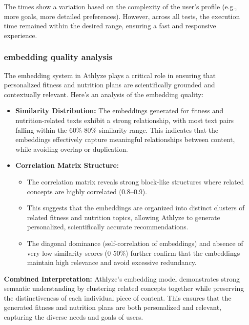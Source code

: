 \documentclass[conference]{IEEEtran}
\begin{document}
The times show a variation based on the complexity of the user's profile (e.g., more goals, more detailed preferences). However, across all tests, the execution time remained within the desired range, ensuring a fast and responsive experience.

\subsubsection{embedding quality analysis}

The embedding system in Athlyze plays a critical role in ensuring that personalized fitness and nutrition plans are scientifically grounded and contextually relevant. Here's an analysis of the embedding quality:

\begin{itemize}
    \item \textbf{Similarity Distribution:} The embeddings generated for fitness and nutrition-related texts exhibit a strong relationship, with most text pairs falling within the 60\%-80\% similarity range. This indicates that the embeddings effectively capture meaningful relationships between content, while avoiding overlap or duplication.
    \item \textbf{Correlation Matrix Structure:} 
    \begin{itemize}
        \item The correlation matrix reveals strong block-like structures where related concepts are highly correlated (0.8–0.9). 
        \item This suggests that the embeddings are organized into distinct clusters of related fitness and nutrition topics, allowing Athlyze to generate personalized, scientifically accurate recommendations.
        \item The diagonal dominance (self-correlation of embeddings) and absence of very low similarity scores (0-50\%) further confirm that the embeddings maintain high relevance and avoid excessive redundancy.
    \end{itemize}
\end{itemize}

\textbf{Combined Interpretation:} Athlyze's embedding model demonstrates strong semantic understanding by clustering related concepts together while preserving the distinctiveness of each individual piece of content. This ensures that the generated fitness and nutrition plans are both personalized and relevant, capturing the diverse needs and goals of users.
\end{document}
